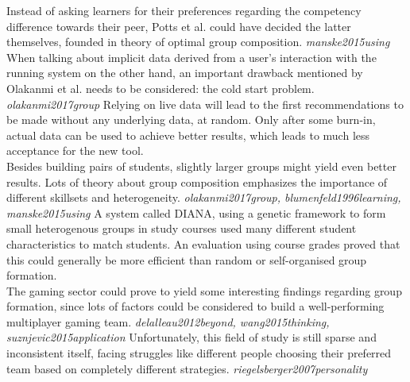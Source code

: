 \documentclass[nochapterpage,bigchapter,linedtoc,longdoc,colorback,accentcolor=tud3b,oneside]{tudreport}
\begin{document}
Instead of asking learners for their preferences regarding the competency difference towards their peer, Potts et al. could have decided the latter themselves, founded in theory of optimal group composition. \textit{manske2015using}\\
When talking about implicit data derived from a user's interaction with the running system on the other hand, an important drawback mentioned by Olakanmi et al. needs to be considered: the cold start problem. \textit{olakanmi2017group} Relying on live data will lead to the first recommendations to be made without any underlying data, at random. Only after some burn-in, actual data can be used to achieve better results, which leads to much less acceptance for the new tool.\\

Besides building pairs of students, slightly larger groups might yield even better results. Lots of theory about group composition emphasizes the importance of different skillsets and heterogeneity. \textit{olakanmi2017group, blumenfeld1996learning, manske2015using} A system called DIANA, using a genetic framework to form small heterogenous groups in study courses used many different student characteristics to match students. An evaluation using course grades proved that this could generally be more efficient than random or self-organised group formation.\\
The gaming sector could prove to yield some interesting findings regarding group formation, since lots of factors could be considered to build a well-performing multiplayer gaming team. \textit{delalleau2012beyond, wang2015thinking, suznjevic2015application} Unfortunately, this field of study is still sparse and inconsistent itself, facing struggles like different people choosing their preferred team based on completely different strategies. \textit{riegelsberger2007personality}\\



\end{document}
